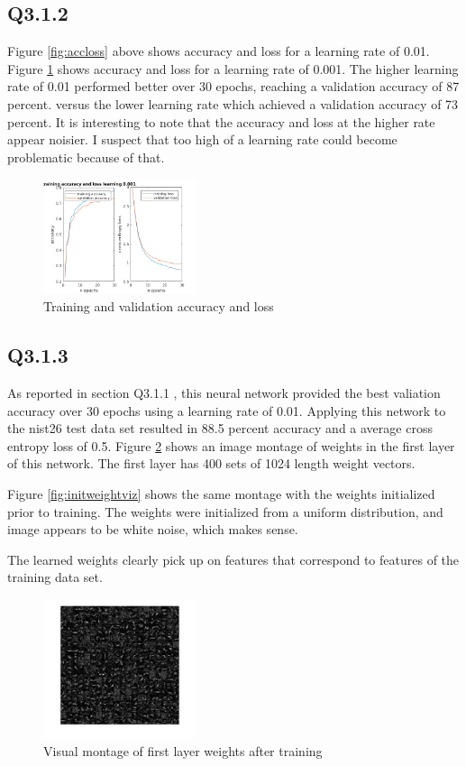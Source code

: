 \documentclass[12pt]{article}
\begin{document}
\subsection{Q3.1.2}
Figure \ref{fig:accloss} above shows accuracy and loss for a learning rate of 0.01.  Figure \ref{fig:accloss001} shows accuracy and loss for a learning rate of 0.001.
The higher learning rate of 0.01 performed better over 30 epochs, reaching a validation accuracy of 87 percent. versus the lower learning rate which achieved a validation accuracy of 73 percent. It is interesting to note that the accuracy and loss at the higher rate appear noisier. I suspect that too high of a learning rate could become problematic because of that.
\begin{figure}[H]
\centering
\includegraphics[page=1,width=0.4\textwidth]{q312}
\caption{Training and validation accuracy and loss} 
\label{fig:accloss001}
\end{figure}   

\subsection{Q3.1.3}
As reported in section Q3.1.1 , this neural network provided the best valiation accuracy over 30 epochs using a learning rate of 0.01. Applying this network to the nist26 test data set resulted in 88.5 percent accuracy and a average cross entropy loss of 0.5. Figure \ref{fig:weightviz} shows an image montage of weights in the first layer of this network. The first layer has 400 sets of 1024 length weight vectors.

Figure \ref{fig:initweightviz} shows the same montage with the weights initialized prior to training. The weights were initialized from a uniform distribution, and image appears to be white noise, which makes sense.

The learned weights clearly pick up on features that correspond to features of the training data set.
\begin{figure}[H]
\centering
\includegraphics[page=1,width=0.4\textwidth]{weight_montage}
\caption{Visual montage of first layer weights after training} 
\label{fig:weightviz}
\end{figure}   
\end{document}
